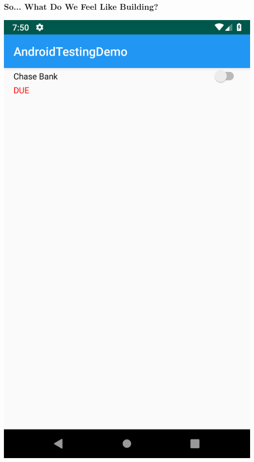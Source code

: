 \documentclass[10pt]{beamer}
\begin{document}
\begin{frame}
    \frametitle{So... What Do We Feel Like Building?}
    \center\includegraphics[scale=0.11]{ui_initial_state}
\end{frame}
\end{document}
